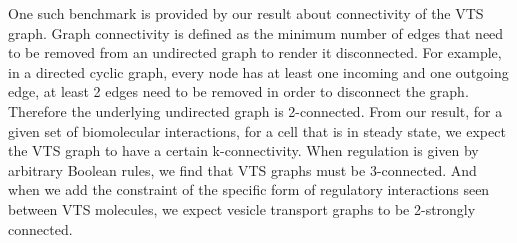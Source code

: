 One such benchmark is provided by our result about connectivity of the VTS graph. Graph connectivity is defined as the minimum number of edges that need to be removed from an undirected graph to render it disconnected. For example, in a directed cyclic graph, every node has at least one incoming and one outgoing edge, at least 2 edges need to be removed in order to disconnect the graph. Therefore the underlying undirected graph is 2-connected. 
From our result, for a given set of biomolecular interactions, for a cell that is in steady state, we expect the VTS graph to have a certain k-connectivity. When regulation is given by arbitrary Boolean rules, we find that VTS graphs must be 3-connected. And when we add the constraint of the specific form of regulatory interactions seen between VTS molecules, we expect vesicle transport graphs to be 2-strongly connected.

